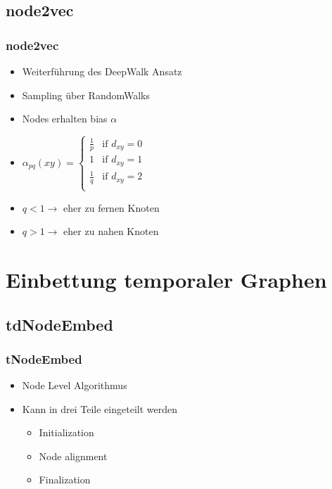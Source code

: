 \documentclass{beamer}
\begin{document}
\subsection{node2vec}
\begin{frame}
  \frametitle{node2vec}
  \begin{itemize}
    \item Weiterführung des DeepWalk Ansatz
    \item Sampling über RandomWalks
    \item Nodes erhalten bias \(\alpha\)
    \item  \(\alpha_{pq}(xy) = \begin{cases} \frac{1}{p} & \text{if } d_{xy} = 0 \\ 1 & \text{if } d_{xy} = 1 \\\frac{1}{q} & \text{if } d_{xy} = 2 \\\end{cases}\)
    \item  \(q < 1 \rightarrow\) eher zu fernen Knoten
    \item  \(q > 1 \rightarrow\) eher zu nahen Knoten
  \end{itemize}
\end{frame}

\section{Einbettung temporaler Graphen}
\subsection{tdNodeEmbed}
\begin{frame}
  \frametitle{tNodeEmbed}
  \begin{itemize}
    \item Node Level Algorithmus
    \item Kann in drei Teile eingeteilt werden
    \begin{itemize}
      \item Initialization
      \item Node alignment
      \item Finalization
    \end{itemize}
  \end{itemize}
\end{frame}
\end{document}
